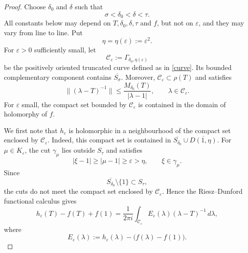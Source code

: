 \documentclass[10pt,a4paper]{amsart}
\begin{document}
\begin{proof}
Choose \(\delta_0\) and \(\delta\) such that
\[
        \sigma<\delta_0<\delta<\tau .
\]
All constants below may depend on \(T,\delta_0,\delta,\tau\) and \(f\), but
not on \(\varepsilon\), and they may vary from line to line.  Put
\begin{equation}\label{eta}
        \eta=\eta(\varepsilon):=\varepsilon^2 .
\end{equation}
For \(\varepsilon>0\) sufficiently small, let
\begin{equation}\label{gammacur}
        \mathcal C_\varepsilon:=\Gamma_{\delta_0,\eta(\varepsilon)}
\end{equation}
be the positively oriented truncated curve defined as in \eqref{curve}.
Its bounded complementary component contains
\(\overline{S_\sigma}\). Moreover, 
\(\mathcal C_\varepsilon \subset \rho(T)\) and satisfies
\[
        \|(\lambda-T)^{-1}\|
        \le
        \frac{M_{\delta_0}(T)}{|\lambda-1|},
        \qquad \lambda\in\mathcal C_\varepsilon.
\]
For \(\varepsilon\) small, the compact set bounded by
\(\mathcal C_\varepsilon\) is contained in the domain of holomorphy of \(f\).



We first note that \(h_\varepsilon\) is holomorphic in a neighbourhood
of the compact set enclosed by \(\mathcal C_\varepsilon\).
Indeed, this compact set is contained in
\(
        \overline{S_{\delta_0}}\cup\overline{D(1,\eta)}.
\)
For \(\mu\in K_\varepsilon\), the cut \(\gamma_\mu\) lies outside
\(S_\tau\) and satisfies
\[
        |\xi-1|\ge|\mu-1|\ge\varepsilon>\eta,
        \qquad \xi\in\gamma_\mu.
\]
Since
\[
        \overline{S_{\delta_0}}\setminus\{1\}\subset S_\tau,
\]
the cuts do not meet the compact set enclosed by
\(\mathcal C_\varepsilon\).
Hence the Riesz--Dunford functional calculus gives
\[
        h_\varepsilon(T)-f(T)+f(1)
        =
        \frac{1}{2\pi i}
        \int_{\mathcal C_\varepsilon}
        E_\varepsilon(\lambda)(\lambda -T)^{-1}\,d\lambda ,
\]
where
\[
        E_\varepsilon(\lambda)
        :=
        h_\varepsilon(\lambda)-\bigl(f(\lambda)-f(1)\bigr).
\]


\end{proof}
\end{document}
